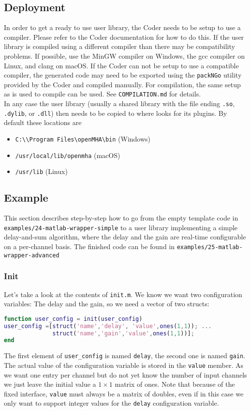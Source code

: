 \documentclass[11pt,a4paper,twoside]{article}
\newcommand{\+}{\discretionary{\mbox{\scriptsize$\hookleftarrow$}}{}{}}
\begin{document}
\subsection{Deployment}
In order to get a ready to use user library, the \Matlab{} Coder needs to be
setup to use a compiler. Please refer to the \Matlab{} Coder documentation for
how to do this. If the user library is compiled using a different compiler than
\mha{} there may be compatibility problems. If possible, use the MinGW
compiler on Windows, the gcc compiler on Linux, and clang on macOS. If the \Matlab{} Coder
can not be setup to use a compatible compiler, the generated code may need to be
exported using the \texttt{packNGo} utility provided by the \Matlab{} Coder and
compiled manually. For compilation, the same setup as is used to compile \mha{}
can be used. See \texttt{COMPILATION.md} for details. \\
In any case the user library (usually a shared library with the file ending
\texttt{.so}, \texttt{.dylib}, or \texttt{.dll}) then needs to be copied to where
\mha{} looks for its plugins. By default these locations are
\begin{itemize}
\item \texttt{C:\textbackslash\textbackslash Program Files\textbackslash openMHA\textbackslash bin} (Windows)
\item \texttt{/usr/local/lib/openmha} (macOS)
\item \texttt{/usr/lib} (Linux)
\end{itemize}
\subsection{Example}
This section describes step-by-step how to go from the empty template code
in \\ \texttt{examples/24-matlab-wrapper-simple}
to a user library implementing a simple delay-and-sum algorithm, where the delay
and the gain are real-time configurable on a per-channel basis.
The finished code can be found in \texttt{examples/25-matlab-wrapper-advanced}
\subsubsection*{Init}
Let's take a look at the contents of \texttt{init.m}. We know we want two
configuration variables:
The delay and the gain, so we need a vector of two structs:
\begin{lstlisting}[language=Matlab]
function user_config = init(user_config)
user_config =[struct('name','delay', 'value',ones(1,1)); ...
              struct('name','gain','value',ones(1,1))];
end
\end{lstlisting}
The first element of \texttt{user\_config} is named \texttt{delay}, the second one is named
\texttt{gain}. The actual value of the configuration variable is stored in the \texttt{value}
member. As we want one entry per channel but do not yet know the number of input
channels we just leave the initial value a $1\times1$ matrix of ones. Note that because of
the fixed interface, \texttt{value} must always be a matrix of doubles, even if in this
case we only want to support integer values for the \texttt{delay} configuration variable.
\end{document}

